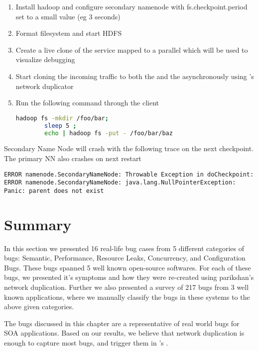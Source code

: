 \begin{adjustwidth}{0.5cm}{}
	\begin{enumerate}
		\item Install hadoop and configure secondary namenode with fs.checkpoint.period set to a small value (eg 3 seconds)
		\item Format filesystem and start HDFS
		\item Create a live clone of the service mapped to a parallel \debugcontainer which will be used to visualize debugging
		\item Start cloning the incoming traffic to both the \productioncontainer and the \debugcontainer asynchronously using \parikshan's network duplicator
		\item Run the following command through the client
		
		\begin{lstlisting}[language=sh]
		hadoop fs -mkdir /foo/bar; 
		sleep 5 ; 
		echo | hadoop fs -put - /foo/bar/baz
		\end{lstlisting}		
	\end{enumerate}

Secondary Name Node will crash with the following trace on the next checkpoint. The primary NN also crashes on next restart

\begin{lstlisting}
ERROR namenode.SecondaryNameNode: Throwable Exception in doCheckpoint:
ERROR namenode.SecondaryNameNode: java.lang.NullPointerException: Panic: parent does not exist
\end{lstlisting}

\end{adjustwidth}





\section{Summary}
\label{sec:parikshanCaseStudySummary}

In this section we presented 16 real-life bug cases from 5 different categories of bugs: Semantic, Performance, Resource Leaks, Concurrency, and Configuration Bugs.
These bugs spanned 5 well known open-source softwares.
For each of these bugs, we presented it's symptoms and how they were re-created using parikshan's network duplication.
Further we also presented a survey of 217 bugs from 3 well known applications, where we manually classify the bugs in these systems to the above given categories.


The bugs discussed in this chapter are a representative of real world bugs for SOA applications.
Based on our results, we believe that network duplication is enough to capture most bugs, and trigger them in \parikshan's \debugcontainer.